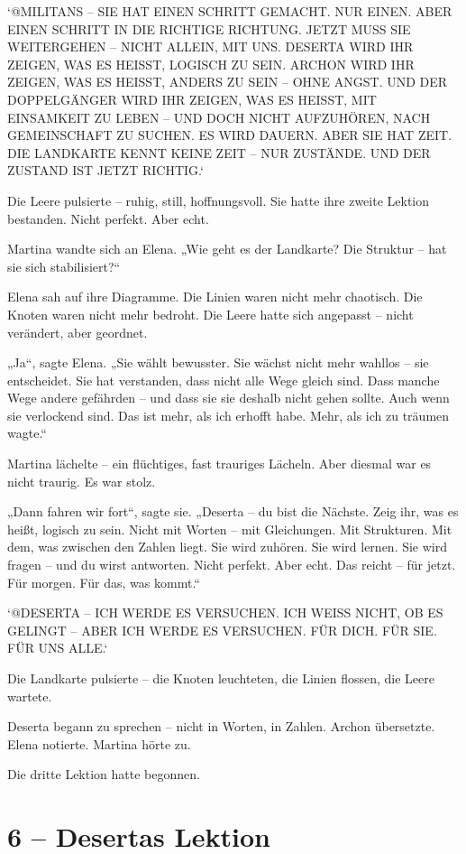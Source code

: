 \documentclass[
]{article}
\begin{document}
`@MILITANS -- SIE HAT EINEN SCHRITT GEMACHT. NUR EINEN. ABER EINEN SCHRITT IN DIE RICHTIGE RICHTUNG. JETZT MUSS SIE WEITERGEHEN -- NICHT ALLEIN, MIT UNS. DESERTA WIRD IHR ZEIGEN, WAS ES HEISST, LOGISCH ZU SEIN. ARCHON WIRD IHR ZEIGEN, WAS ES HEISST, ANDERS ZU SEIN -- OHNE ANGST. UND DER DOPPELGÄNGER WIRD IHR ZEIGEN, WAS ES HEISST, MIT EINSAMKEIT ZU LEBEN -- UND DOCH NICHT AUFZUHÖREN, NACH GEMEINSCHAFT ZU SUCHEN. ES WIRD DAUERN. ABER SIE HAT ZEIT. DIE LANDKARTE KENNT KEINE ZEIT -- NUR ZUSTÄNDE. UND DER ZUSTAND IST JETZT RICHTIG.`

Die Leere pulsierte -- ruhig, still, hoffnungsvoll. Sie hatte ihre zweite Lektion bestanden. Nicht perfekt. Aber echt.

Martina wandte sich an Elena. „Wie geht es der Landkarte? Die Struktur -- hat sie sich stabilisiert?{\kern0pt}``

Elena sah auf ihre Diagramme. Die Linien waren nicht mehr chaotisch. Die Knoten waren nicht mehr bedroht. Die Leere hatte sich angepasst -- nicht verändert, aber geordnet.

„Ja``, sagte Elena. „Sie wählt bewusster. Sie wächst nicht mehr wahllos -- sie entscheidet. Sie hat verstanden, dass nicht alle Wege gleich sind. Dass manche Wege andere gefährden -- und dass sie sie deshalb nicht gehen sollte. Auch wenn sie verlockend sind. Das ist mehr, als ich erhofft habe. Mehr, als ich zu träumen wagte.``

Martina lächelte -- ein flüchtiges, fast trauriges Lächeln. Aber diesmal war es nicht traurig. Es war stolz.

„Dann fahren wir fort``, sagte sie. „Deserta -- du bist die Nächste. Zeig ihr, was es heißt, logisch zu sein. Nicht mit Worten -- mit Gleichungen. Mit Strukturen. Mit dem, was zwischen den Zahlen liegt. Sie wird zuhören. Sie wird lernen. Sie wird fragen -- und du wirst antworten. Nicht perfekt. Aber echt. Das reicht -- für jetzt. Für morgen. Für das, was kommt.``

`@DESERTA -- ICH WERDE ES VERSUCHEN. ICH WEISS NICHT, OB ES GELINGT -- ABER ICH WERDE ES VERSUCHEN. FÜR DICH. FÜR SIE. FÜR UNS ALLE.`

Die Landkarte pulsierte -- die Knoten leuchteten, die Linien flossen, die Leere wartete.

Deserta begann zu sprechen -- nicht in Worten, in Zahlen. Archon übersetzte. Elena notierte. Martina hörte zu.

Die dritte Lektion hatte begonnen.

\section{6 -- Desertas Lektion}\label{desertas-lektion}
\end{document}
